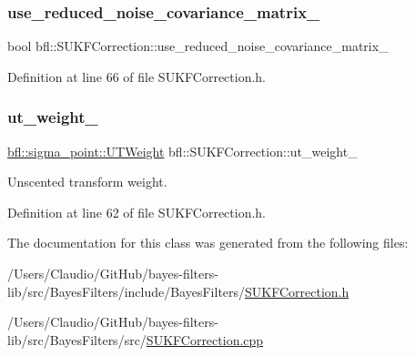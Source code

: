 \subsubsection{\texorpdfstring{use\+\_\+reduced\+\_\+noise\+\_\+covariance\+\_\+matrix\+\_\+}{use\_reduced\_noise\_covariance\_matrix\_}}
{\footnotesize\ttfamily bool bfl\+::\+S\+U\+K\+F\+Correction\+::use\+\_\+reduced\+\_\+noise\+\_\+covariance\+\_\+matrix\+\_\+\hspace{0.3cm}{\ttfamily [private]}}



Definition at line 66 of file S\+U\+K\+F\+Correction.\+h.

\mbox{\label{classbfl_1_1SUKFCorrection_aee8ef14b7af58d05f57eb22cbe951ef3}} 
\subsubsection{\texorpdfstring{ut\+\_\+weight\+\_\+}{ut\_weight\_}}
{\footnotesize\ttfamily \mbox{\hyperlink{structbfl_1_1sigma__point_1_1UTWeight}{bfl\+::sigma\+\_\+point\+::\+U\+T\+Weight}} bfl\+::\+S\+U\+K\+F\+Correction\+::ut\+\_\+weight\+\_\+\hspace{0.3cm}{\ttfamily [private]}}



Unscented transform weight. 



Definition at line 62 of file S\+U\+K\+F\+Correction.\+h.



The documentation for this class was generated from the following files\+:\begin{DoxyCompactItemize}
\item 
/\+Users/\+Claudio/\+Git\+Hub/bayes-\/filters-\/lib/src/\+Bayes\+Filters/include/\+Bayes\+Filters/\mbox{\hyperlink{SUKFCorrection_8h}{S\+U\+K\+F\+Correction.\+h}}\item 
/\+Users/\+Claudio/\+Git\+Hub/bayes-\/filters-\/lib/src/\+Bayes\+Filters/src/\mbox{\hyperlink{SUKFCorrection_8cpp}{S\+U\+K\+F\+Correction.\+cpp}}\end{DoxyCompactItemize}
